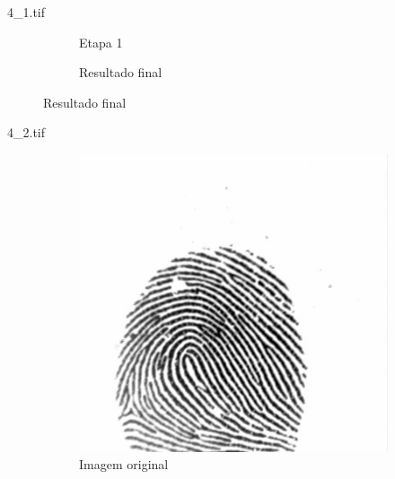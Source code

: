 \documentclass{beamer}
\begin{document}
\begin{frame}{4\_1.tif}
\begin{figure}
\begin{subfigure}[!ht]{0.32\textwidth}
                \caption{Etapa 1}
            \end{subfigure}
            \begin{subfigure}[!ht]{0.32\textwidth}
                \caption{Resultado final}
            \end{subfigure}
        \end{figure}
    \end{frame}

    \begin{frame}{4\_2.tif}
        \begin{figure}
            \centering
            \begin{subfigure}[!ht]{0.32\textwidth}
                \includegraphics[width=\columnwidth]{Fingerprints/4_2.jpg}
                \caption{Imagem original}
            \end{subfigure}
            \begin{subfigure}[!ht]{0.32\textwidth}

\end{subfigure}
\end{figure}
\end{frame}
\end{document}
